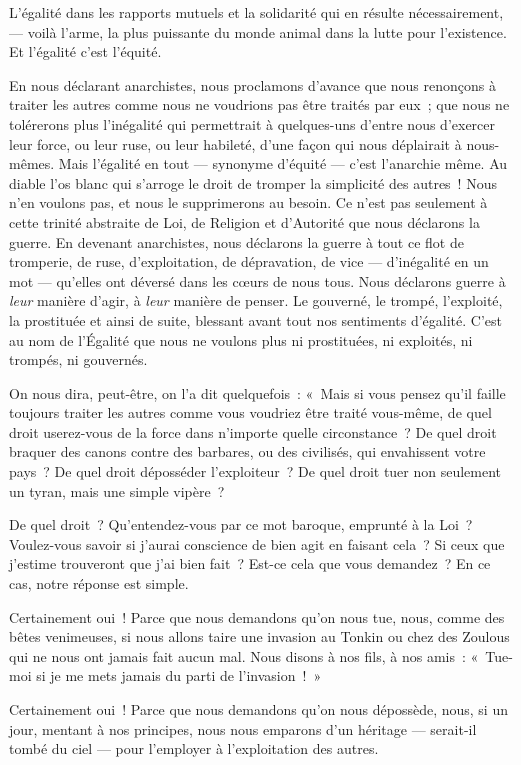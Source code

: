 \documentclass[french,twoside]{book} %
\begin{document}
L’égalité dans les rapports mutuels et la solidarité qui en résulte nécessairement, — voilà l’arme, la plus puissante du monde animal dans la lutte pour l’existence. Et l’égalité c’est l’équité.\par
En nous déclarant anarchistes, nous proclamons d’avance que nous renonçons à traiter les autres comme nous ne voudrions pas être traités par eux ; que nous ne tolérerons plus l’inégalité qui permettrait à quelques-uns d’entre nous d’exercer leur force, ou leur ruse, ou leur habileté, d’une façon qui nous déplairait à nous-mêmes. Mais l’égalité en tout — synonyme d’équité — c’est l’anarchie même. Au diable l’os blanc qui s’arroge le droit de tromper la simplicité des autres ! Nous n’en voulons pas, et nous le supprimerons au besoin. Ce n’est pas seulement à cette trinité abstraite de Loi, de Religion et d’Autorité que nous déclarons la guerre. En devenant anarchistes, nous déclarons la guerre à tout ce flot de tromperie, de ruse, d’exploitation, de dépravation, de vice — d’inégalité en un mot — qu’elles ont déversé dans les cœurs de nous tous. Nous déclarons guerre à \emph{leur} manière d’agir, à \emph{leur} manière de penser. Le gouverné, le trompé, l’exploité, la prostituée et ainsi de suite, blessant avant tout nos sentiments d’égalité. C’est au nom de l’Égalité que nous ne voulons plus ni prostituées, ni exploités, ni trompés, ni gouvernés.\par
\bigbreak
\noindent On nous dira, peut-être, on l’a dit quelquefois : « Mais si vous pensez qu’il faille toujours traiter les autres comme vous voudriez être traité vous-même, de quel droit userez-vous de la force dans n’importe quelle circonstance ? De quel droit braquer des canons contre des barbares, ou des civilisés, qui envahissent votre pays ? De quel droit déposséder l’exploiteur ? De quel droit tuer non seulement un tyran, mais une simple vipère ?\par
De quel droit ? Qu’entendez-vous par ce mot baroque, emprunté à la Loi ? Voulez-vous savoir si j’aurai conscience de bien agit en faisant cela ? Si ceux que j’estime trouveront que j’ai bien fait ? Est-ce cela que vous demandez ? En ce cas, notre réponse est simple.\par
 Certainement oui ! Parce que nous demandons qu’on nous tue, nous, comme des bêtes venimeuses, si nous allons taire une invasion au Tonkin ou chez des Zoulous qui ne nous ont jamais fait aucun mal. Nous disons à nos fils, à nos amis : « Tue-moi si je me mets jamais du parti de l’invasion ! »\par
Certainement oui ! Parce que nous demandons qu’on nous dépossède, nous, si un jour, mentant à nos principes, nous nous emparons d’un héritage — serait-il tombé du ciel — pour l’employer à l’exploitation des autres.\par
\end{document}
